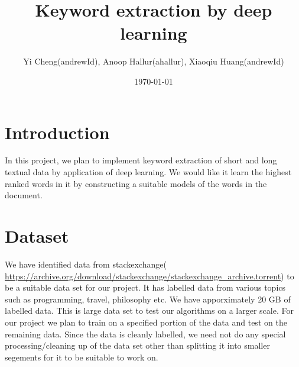 \documentclass[dvips,12pt]{article}
\begin{document}
	
	
	\title{Keyword extraction by deep learning}
	\author{Yi Cheng(andrewId), Anoop Hallur(ahallur), Xiaoqiu Huang(andrewId)}
	\date{\today}
	
	
	\maketitle
	
	
	\section{Introduction}
		In this project, we plan to implement keyword extraction of short and long textual data by application of deep learning. We would like it learn the highest ranked words in it by constructing a suitable models of the words in the document.

	\section{Dataset}
		We have identified data from stackexchange( \url{https://archive.org/download/stackexchange/stackexchange_archive.torrent}) to be a suitable data set for our project. It has labelled data from various topics such as programming, travel, philosophy etc. We have apporximately 20 GB of labelled data. This is large data set to test our algorithms on a larger scale. For our project we plan to train on a specified portion of the data and test on the remaining data. Since the data is cleanly labelled, we need not do any special processing/cleaning up of the data set other than splitting it into smaller segements for it to be suitable to work on.
	
\end{document}
